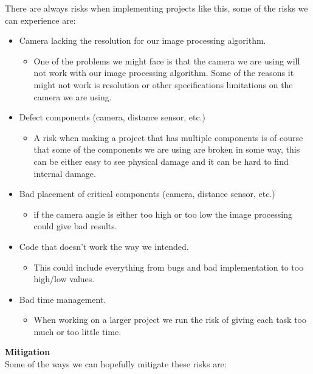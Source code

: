 \documentclass[11pt]{article}
\begin{document}
There are always risks when implementing projects like this, some of the risks we can experience are: 
\begin{itemize}
    \item Camera lacking the resolution for our image processing algorithm. \begin{itemize}
        \item One of the problems we might face is that the camera we are using will not work with our image processing algorithm. Some of the reasons it might not work is resolution or other specifications limitations on the camera we are using. 
    \end{itemize}
    \item Defect components (camera, distance sensor, etc.) \begin{itemize}
        \item A risk when making a project that has multiple components is of course that some of the components we are using are broken in some way, this can be either easy to see physical damage and it can be hard to find internal damage. 
    \end{itemize}
    \item Bad placement of critical components (camera, distance sensor, etc.) \begin{itemize}
        \item if the camera angle is either too high or too low the image processing could give bad results.
    \end{itemize}
    \item Code that doesn’t work the way we intended. \begin{itemize}
        \item This could include everything from bugs and bad implementation to too high/low values.
    \end{itemize}
    \item Bad time management. \begin{itemize}
        \item When working on a larger project we run the risk of giving each task too much or too little time. 
    \end{itemize}
\end{itemize}
\textbf{Mitigation}\\
Some of the ways we can hopefully mitigate these risks are:
\end{document}
